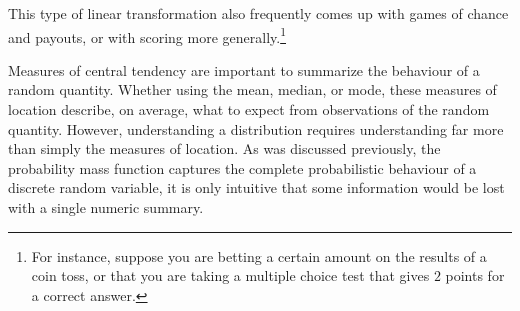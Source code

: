 \documentclass[
  letterpaper,
  DIV=11,
  numbers=noendperiod]{scrreprt}
\theoremstyle{definition}
\theoremstyle{definition}
\theoremstyle{definition}
\theoremstyle{remark}
\begin{document}
This type of linear transformation also frequently comes up with games
of chance and payouts, or with scoring more generally.\footnote{For
  instance, suppose you are betting a certain amount on the results of a
  coin toss, or that you are taking a multiple choice test that gives
  \(2\) points for a correct answer.}

Measures of central tendency are important to summarize the behaviour of
a random quantity. Whether using the mean, median, or mode, these
measures of location describe, on average, what to expect from
observations of the random quantity. However, understanding a
distribution requires understanding far more than simply the measures of
location. As was discussed previously, the probability mass function
captures the complete probabilistic behaviour of a discrete random
variable, it is only intuitive that some information would be lost with
a single numeric summary.
\end{document}
